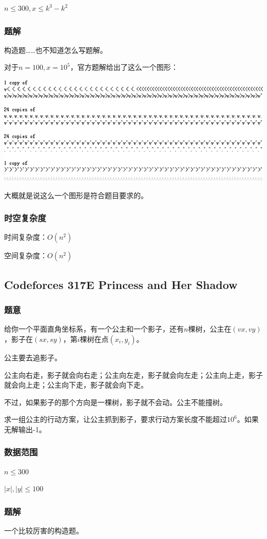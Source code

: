 \documentclass{ctexart}
\begin{document}
$n \le 300,x \le k^3-k^2$
\subsubsection{题解}
构造题……也不知道怎么写题解。

对于$n=100,x=10^5$，官方题解给出了这么一个图形：

\includegraphics{temple_solution.png}

大概就是说这么一个图形是符合题目要求的。
\subsubsection{时空复杂度}
时间复杂度：$O(n^2)$

空间复杂度：$O(n^2)$
\subsection{Codeforces 317E Princess and Her Shadow}
\subsubsection{题意}
给你一个平面直角坐标系，有一个公主和一个影子，还有$n$棵树，公主在$(vx,vy)$，影子在$(sx,sy)$，第$i$棵树在点$(x_i,y_i)$。

公主要去追影子。

公主向右走，影子就会向右走；公主向左走，影子就会向左走；公主向上走，影子就会向上走；公主向下走，影子就会向下走。

不过，如果影子的那个方向是一棵树，影子就不会动。公主不能撞树。

求一组公主的行动方案，让公主抓到影子，要求行动方案长度不能超过$10^6$。如果无解输出-1。
\subsubsection{数据范围}
$n \le 300$

$|x|,|y| \le 100$
\subsubsection{题解}
一个比较厉害的构造题。
\end{document}
